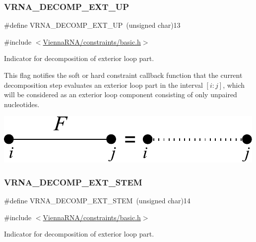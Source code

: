 \subsubsection{\texorpdfstring{VRNA\_DECOMP\_EXT\_UP}{VRNA\_DECOMP\_EXT\_UP}}
{\footnotesize\ttfamily \#define V\+R\+N\+A\+\_\+\+D\+E\+C\+O\+M\+P\+\_\+\+E\+X\+T\+\_\+\+UP~(unsigned char)13}



{\ttfamily \#include $<$\mbox{\hyperlink{constraints_2basic_8h}{Vienna\+R\+N\+A/constraints/basic.\+h}}$>$}



Indicator for decomposition of exterior loop part. 

This flag notifies the soft or hard constraint callback function that the current decomposition step evaluates an exterior loop part in the interval $[i:j]$, which will be considered as an exterior loop component consisting of only unpaired nucleotides.

 
\begin{DoxyImageNoCaption}
  \mbox{\includegraphics[width=\textwidth,height=\textheight/2,keepaspectratio=true]{decomp_ext_up}}
\end{DoxyImageNoCaption}
 \mbox{\label{group__constraints_gae44b5ace0d9b4a29088069ecb4cec441}} 
\subsubsection{\texorpdfstring{VRNA\_DECOMP\_EXT\_STEM}{VRNA\_DECOMP\_EXT\_STEM}}
{\footnotesize\ttfamily \#define V\+R\+N\+A\+\_\+\+D\+E\+C\+O\+M\+P\+\_\+\+E\+X\+T\+\_\+\+S\+T\+EM~(unsigned char)14}



{\ttfamily \#include $<$\mbox{\hyperlink{constraints_2basic_8h}{Vienna\+R\+N\+A/constraints/basic.\+h}}$>$}



Indicator for decomposition of exterior loop part. 

